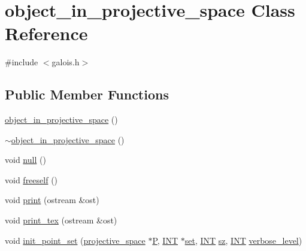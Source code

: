 \hypertarget{classobject__in__projective__space}{}\section{object\+\_\+in\+\_\+projective\+\_\+space Class Reference}
\label{classobject__in__projective__space}


{\ttfamily \#include $<$galois.\+h$>$}

\subsection*{Public Member Functions}
\begin{DoxyCompactItemize}
\item 
\mbox{\hyperlink{classobject__in__projective__space_a57c7803b80a880d6fcbb13dec860702c}{object\+\_\+in\+\_\+projective\+\_\+space}} ()
\item 
\mbox{\hyperlink{classobject__in__projective__space_ac2637c804ab163d90e54008bce0580af}{$\sim$object\+\_\+in\+\_\+projective\+\_\+space}} ()
\item 
void \mbox{\hyperlink{classobject__in__projective__space_a07908386e9bb21615dc8415379b2f4e2}{null}} ()
\item 
void \mbox{\hyperlink{classobject__in__projective__space_a371bc4c5e7744127cc8b75fad5903ac1}{freeself}} ()
\item 
void \mbox{\hyperlink{classobject__in__projective__space_a056911c0013ac43d89cdc9cfd21f6545}{print}} (ostream \&ost)
\item 
void \mbox{\hyperlink{classobject__in__projective__space_abd9a530e510784dda9865c60de9d5230}{print\+\_\+tex}} (ostream \&ost)
\item 
void \mbox{\hyperlink{classobject__in__projective__space_ae06b87acb715d13efec5f6dcea0908ca}{init\+\_\+point\+\_\+set}} (\mbox{\hyperlink{classprojective__space}{projective\+\_\+space}} $\ast$\mbox{\hyperlink{classobject__in__projective__space_abd304b597ccddaf6bd78c29dc1ca3da8}{P}}, \mbox{\hyperlink{galois_8h_a09fddde158a3a20bd2dcadb609de11dc}{I\+NT}} $\ast$\mbox{\hyperlink{nauty_8h_a9690bea211101f22a5e154087590c3da}{set}}, \mbox{\hyperlink{galois_8h_a09fddde158a3a20bd2dcadb609de11dc}{I\+NT}} \mbox{\hyperlink{classobject__in__projective__space_a2dda692174f30d566b26bf58e62c14cc}{sz}}, \mbox{\hyperlink{galois_8h_a09fddde158a3a20bd2dcadb609de11dc}{I\+NT}} \mbox{\hyperlink{simeon_8_c_a818073fbcc2f439e7c56952f67386122}{verbose\+\_\+level}})
\item 

\end{DoxyCompactItemize}
